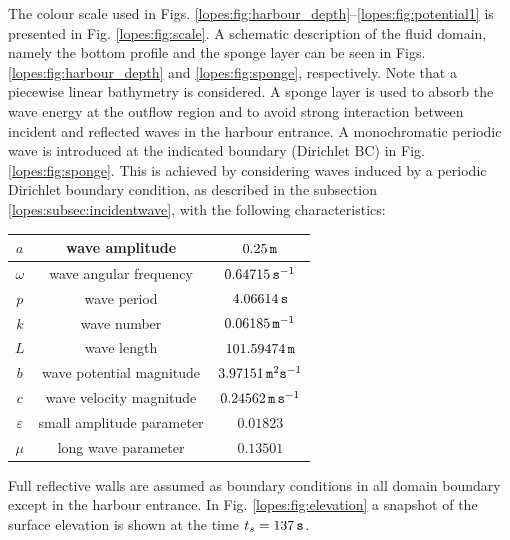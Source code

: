 The colour scale used in Figs. \ref{lopes:fig:harbour_depth}--\ref{lopes:fig:potential1}  is presented in
Fig. \ref{lopes:fig:scale}.
A schematic description of the fluid domain, namely the bottom profile and the
sponge layer can be seen in Figs. \ref{lopes:fig:harbour_depth}
and \ref{lopes:fig:sponge}, respectively. 
Note that a piecewise linear bathymetry  is considered. 
A sponge layer is used to absorb the wave energy at the
outflow region 
and to avoid strong  interaction between incident and
reflected waves  in the harbour entrance.
 A monochromatic periodic wave
is introduced at the indicated boundary (Dirichlet BC) in
Fig. \ref{lopes:fig:sponge}.
This is achieved by considering waves induced by
a periodic Dirichlet boundary condition, as
described in the subsection \ref{lopes:subsec:incidentwave},
with the following characteristics:
\begin{center}
\renewcommand{\arraystretch}{1.3}
\begin{tabular}{|c|c|c|}
\hline
\(a\)       &   wave  amplitude &     \(0.25 \,{\tt m}\)\\ \hline
\(\omega\)  &   wave angular frequency       &   \(0.64715 \,{\tt s}^{-1}\)\\ \hline
\(p\)       &   wave  period  &       \(4.06614 \,{\tt s}\)\\ \hline
\(k\)       &   wave number &   \(0.06185 \,{\tt m}^{-1}\)\\ \hline
\(L\)       &   wave length &       \(101.59474 \,{\tt m}\)\\ \hline
\(b\)       &   wave potential magnitude&   \(3.97151 \,{\tt m}^2{\tt s}^{-1}\)\\ \hline
\(c\)       &   wave velocity  magnitude&  \(0.24562 \,{\tt m\, s}^{-1}\) \\ \hline
\(\varepsilon\)&   small amplitude parameter & \(0.01823\)\\ \hline
\(\mu\)     &   long wave parameter &       \(0.13501\)\\ \hline
\end{tabular}
\end{center}
Full reflective walls are assumed as boundary conditions in
all domain boundary except in the harbour entrance.
In Fig. \ref{lopes:fig:elevation} 
a snapshot of the surface elevation  is shown at the time 
 \(t_s=137\,{\tt s}\).

